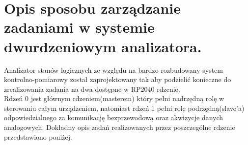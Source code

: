 \section{Opis sposobu zarządzanie zadaniami w systemie dwurdzeniowym analizatora.}

Analizator stanów logicznych ze względu na bardzo rozbudowany system kontrolno-pomiarowy
został zaprojektowany tak aby podzielić konieczne do zrealizowania zadania na dwa dostępne w 
RP2040 rdzenie. \\
Rdzeń 0 jest głównym rdzeniem(masterem) który pełni nadrzędną rolę w sterowaniu całym urządzeniem,
natomiast rdzeń 1 pełni rolę podrzędną(slave'a) odpowiedzialnego za komunikację bezprzewodową oraz akwizycje danych analogowych.
Dokładny opis zadań realizowanych przez poszczególne rdzenie przedstawiono poniżej.

